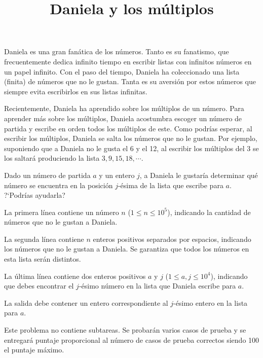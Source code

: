\documentclass{oci}
\title{Daniela y los múltiplos}
\begin{document}
\begin{problemDescription}
Daniela es una gran fanática de los números.
Tanto es su fanatismo, que frecuentemente dedica infinito tiempo en
escribir listas con infinitos números en un papel infinito.
Con el paso del tiempo, Daniela ha coleccionado una lista (finita) de números que no
le gustan.
Tanta es su aversión por estos números que siempre evita escribirlos en sus
listas infinitas.

Recientemente, Daniela ha aprendido sobre los múltiplos de un número.
Para aprender más sobre los múltiplos, Daniela acostumbra escoger un número de partida y
escribe en orden todos los múltiplos de este.
Como podrías esperar, al escribir los múltiplos, Daniela se salta los números que no le gustan.
Por ejemplo, suponiendo que a Daniela no le gusta el 6 y el 12, al escribir los múltiplos
del 3 se los saltará produciendo la lista $3, 9, 15, 18, \cdots$.

Dado un número de partida $a$ y un entero $j$, a Daniela le gustaría determinar
qué número se encuentra en la posición $j$-ésima de la lista que escribe para $a$.
?`Podrías ayudarla?
\end{problemDescription}

\begin{inputDescription}
La primera línea contiene un número $n$ ($1 \leq n \leq 10^5$), indicando la cantidad de números que no le gustan
a Daniela.

La segunda línea contiene $n$ enteros positivos separados por espacios,
indicando los números que no le gustan a Daniela.
Se garantiza que todos los números en esta lista serán distintos.

La última línea contiene dos enteros positivos $a$ y $j$ ($1 \leq a, j \leq 10^4$),
indicando que debes encontrar el $j$-ésimo número en la lista que Daniela
escribe para $a$.
\end{inputDescription}

\begin{outputDescription}
La salida debe contener un entero correspondiente al $j$-ésimo entero en la lista
para $a$.
\end{outputDescription}

\begin{scoreDescription}
Este problema no contiene subtareas.
Se probarán varios casos de prueba y se entregará puntaje proporcional al número
de casos de prueba correctos siendo 100 el puntaje máximo.
\end{scoreDescription}


\begin{sampleDescription}
\end{sampleDescription}
\end{document}
